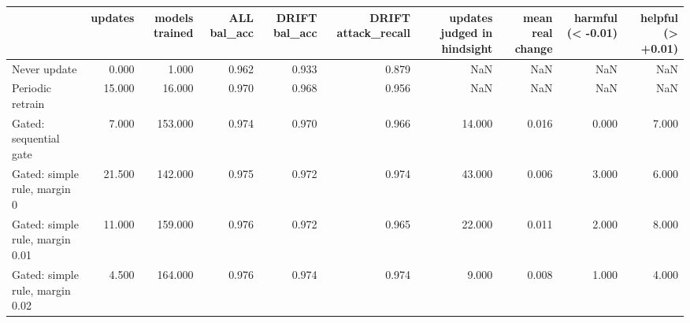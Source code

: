 \begin{tabular}{lrrrrrrrrr}
\toprule
 & updates & models trained & ALL bal_acc & DRIFT bal_acc & DRIFT attack_recall & updates judged in hindsight & mean real change & harmful (< -0.01) & helpful (> +0.01) \\
\midrule
Never update & 0.000 & 1.000 & 0.962 & 0.933 & 0.879 & NaN & NaN & NaN & NaN \\
Periodic retrain & 15.000 & 16.000 & 0.970 & 0.968 & 0.956 & NaN & NaN & NaN & NaN \\
Gated: sequential gate & 7.000 & 153.000 & 0.974 & 0.970 & 0.966 & 14.000 & 0.016 & 0.000 & 7.000 \\
Gated: simple rule, margin 0 & 21.500 & 142.000 & 0.975 & 0.972 & 0.974 & 43.000 & 0.006 & 3.000 & 6.000 \\
Gated: simple rule, margin 0.01 & 11.000 & 159.000 & 0.976 & 0.972 & 0.965 & 22.000 & 0.011 & 2.000 & 8.000 \\
Gated: simple rule, margin 0.02 & 4.500 & 164.000 & 0.976 & 0.974 & 0.974 & 9.000 & 0.008 & 1.000 & 4.000 \\
\bottomrule
\end{tabular}
